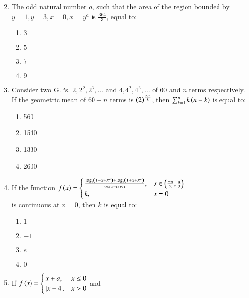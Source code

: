 \documentclass[journal]{IEEEtran}
\begin{document}
\begin{enumerate}
\begin{multicols}{2}
\begin{enumerate}
        \end{enumerate}
    \end{multicols}
    \item The odd natural number $a$, such that the area of the region bounded by $y = 1,y=3,x=0,x=y^a$ is $\frac{364}{3}$, equal to:
    \begin{multicols}{2}
        \begin{enumerate}
            \item $3$
            \item $5$
            \item$7$
            \item $9$
        \end{enumerate}
    \end{multicols}
    \item Consider two G.Ps. $2,2^2,2^3,\dots$ and $4,4^2,4^3,\dots$ of $60$ and $n$ terms respectively. If the geometric mean of $60+n$ terms is $\left(2\right)^\frac{225}{8}$, then $\sum_{k=1}^{n} k\left(n-k\right)$ is equal to:
    \begin{multicols}{2}
        \begin{enumerate}
            \item 560
            \item 1540
            \item 1330
            \item 2600
        \end{enumerate}
    \end{multicols}
    \item If the function 
    $f\left(x\right) = 
    \begin{cases}
        \frac{\log_e\left(1-x+x^2\right)+\log_e\left(1+x+x^2\right)}{\sec{x}-\cos{x}}, &x \in \left(\frac{-\pi}{2},\frac{\pi}{2}\right) \\
    k        ,&x = 0
    \end{cases}$\\
    is continuous at $x=0$, then $k$ is equal to:
    \begin{multicols}{2}
        \begin{enumerate}
            \item $1$
            \item $-1$
            \item$e$
            \item $0$
            
        \end{enumerate}
    \end{multicols}
    \item If $ f\left(x\right) =
        \begin{cases}
            x+a , &x \leq 0 \\
            |x-4|, &x > 0
        \end{cases} $ 
        and
        

\end{enumerate}
\end{document}
